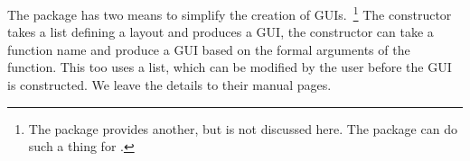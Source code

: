 The  package has two means to simplify the creation of
GUIs.~\footnote{The  package provides another, but is not
  discussed here. The  package can do such a thing for
  .}  The  constructor takes a list
defining a layout and produces a GUI, the 
constructor can take a function name and produce a GUI based on the
formal arguments of the function. This too uses a list, which can be
modified by the user before the GUI is constructed. We leave the
details to their manual pages.









